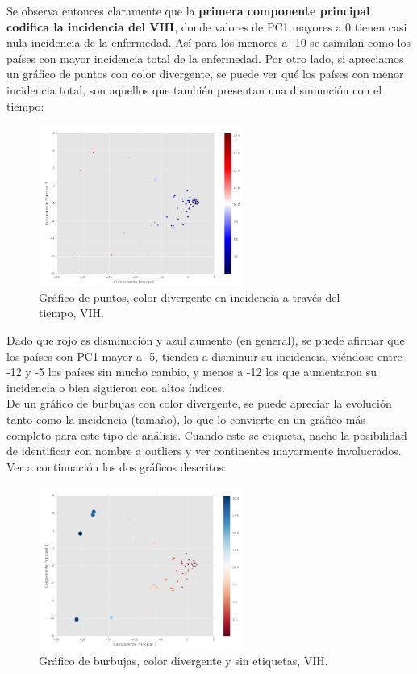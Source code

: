 \documentclass[letter, 10pt]{article}
\begin{document}
Se observa entonces claramente que la \textbf{primera componente principal codifica la incidencia del VIH}, donde valores de PC1 mayores a 0 tienen casi nula incidencia de la enfermedad. Así para los menores a -10 se asimilan como los países con mayor incidencia total de la enfermedad. Por otro lado, si apreciamos un gráfico de puntos con color divergente, se puede ver qué los países con menor incidencia total, son aquellos que también presentan una disminución con el tiempo:

\begin{figure}[H]
\begin{center}
\includegraphics[width=0.6\textwidth]{Images/4scatter2.png}
\caption{Gráfico de puntos, color divergente en incidencia a través del tiempo, VIH.}
\end{center}
\end{figure}

Dado que rojo es disminución y azul aumento (en general), se puede afirmar que los países con PC1 mayor a -5, tienden a disminuir su incidencia, viéndose entre -12 y -5 los países sin mucho cambio, y menos a -12 los que aumentaron su incidencia o bien siguieron con altos índices.\\

De un gráfico de burbujas con color divergente, se puede apreciar la evolución tanto como la incidencia (tamaño), lo que lo convierte en un gráfico más completo para este tipo de análisis. Cuando este se etiqueta, nache la posibilidad de identificar con nombre a outliers y ver continentes mayormente involucrados. Ver a continuación los dos gráficos descritos:

\begin{figure}[H]
\begin{center}
\includegraphics[width=0.6\textwidth]{Images/5bub.png}
\caption{Gráfico de burbujas, color divergente y sin etiquetas, VIH.}
\end{center}
\end{figure}
\end{document}
